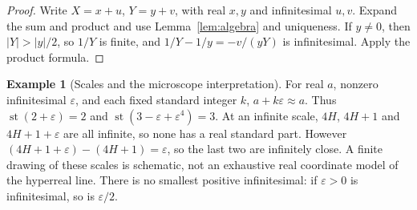 \documentclass[11pt]{article}
\theoremstyle{definition}
\newtheorem{example}[theorem]{Example}
\theoremstyle{remark}
\DeclareMathOperator{\st}{st}
\begin{document}
\begin{proof}
Write \(X=x+u\), \(Y=y+v\), with real \(x,y\) and infinitesimal \(u,v\).
Expand the sum and product and use Lemma~\ref{lem:algebra} and uniqueness.
If \(y\ne0\), then \(|Y|>|y|/2\), so \(1/Y\) is finite, and
\(1/Y-1/y=-v/(yY)\) is infinitesimal. Apply the product formula.
\end{proof}
\begin{example}[Scales and the microscope interpretation]\label{ex:scales}
For real \(a\), nonzero infinitesimal \(\varepsilon\), and each fixed standard
integer \(k\), \(a+k\varepsilon\approx a\). Thus
\(\st(2+\varepsilon)=2\) and \(\st(3-\varepsilon+\varepsilon^4)=3\).
At an infinite scale, \(4H\), \(4H+1\) and \(4H+1+\varepsilon\) are all infinite,
so none has a real standard part. However
\((4H+1+\varepsilon)-(4H+1)=\varepsilon\), so the last two are infinitely close.
A finite drawing of these scales is schematic, not an exhaustive real coordinate
model of the hyperreal line. There is no smallest positive infinitesimal: if
\(\varepsilon>0\) is infinitesimal, so is \(\varepsilon/2\).
\end{example}
\end{document}
